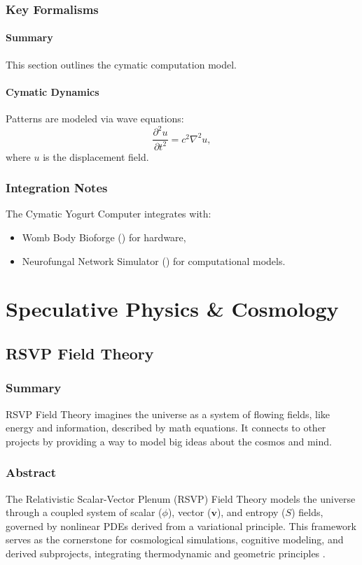 \documentclass[11pt,oneside]{memoir}
\theoremstyle{plain}
\begin{document}
\section{Key Formalisms}
\subsection{Summary}
This section outlines the cymatic computation model.

\subsection{Cymatic Dynamics}
Patterns are modeled via wave equations:
\begin{equation}
    \frac{\partial^2 u}{\partial t^2} = c^2 \nabla^2 u,
\end{equation}
where \(u\) is the displacement field.

\section{Integration Notes}
The Cymatic Yogurt Computer integrates with:
\begin{itemize}
    \item Womb Body Bioforge () for hardware,
    \item Neurofungal Network Simulator () for computational models.
\end{itemize}

\part{Speculative Physics \& Cosmology}

\chapter{RSVP Field Theory}
\label{sec:rsvp_field}

\section{Summary}
RSVP Field Theory imagines the universe as a system of flowing fields, like energy and information, described by math equations. It connects to other projects by providing a way to model big ideas about the cosmos and mind.

\section{Abstract}
The Relativistic Scalar-Vector Plenum (RSVP) Field Theory models the universe through a coupled system of scalar (\(\phi\)), vector (\(\mathbf{v}\)), and entropy (\(S\)) fields, governed by nonlinear PDEs derived from a variational principle. This framework serves as the cornerstone for cosmological simulations, cognitive modeling, and derived subprojects, integrating thermodynamic and geometric principles \cite{evans}.
\end{document}
